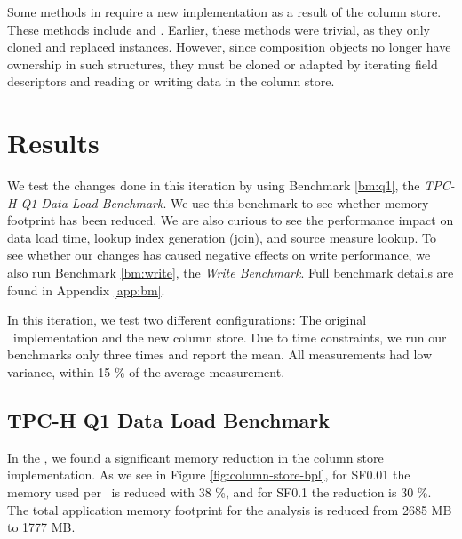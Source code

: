 Some methods in  require a new implementation as a result of the column store. These methods include  and . Earlier, these methods were trivial, as they only cloned and replaced  instances. However, since composition objects no longer have ownership in such structures, they must be cloned or adapted by iterating field descriptors and reading or writing data in the column store.

\section{Results}
\label{sec:Results}
We test the changes done in this iteration by using Benchmark \ref{bm:q1}, the \textit{TPC-H Q1 Data Load Benchmark}. We use this benchmark to see whether memory footprint has been reduced. We are also curious to see the performance impact on data load time, lookup index generation (join), and source measure lookup. To see whether our changes has caused negative effects on write performance, we also run Benchmark \ref{bm:write}, the \textit{Write Benchmark}. Full benchmark details are found in Appendix \ref{app:bm}.

In this iteration, we test two different configurations: The original \gap~implementation and the new column store. Due to time constraints, we run our benchmarks only three times and report the mean. All measurements had low variance, within 15 \% of the average measurement.

\subsection{TPC-H Q1 Data Load Benchmark}
\label{column-store:q1}

In the \tpchdl, we found a significant memory reduction in the column store implementation. As we see in Figure \ref{fig:column-store-bpl}, for SF0.01 the memory used per \lineitem~is reduced with 38 \%, and for SF0.1 the reduction is 30 \%. The total application memory footprint for the analysis is reduced from 2685 MB to 1777 MB.

